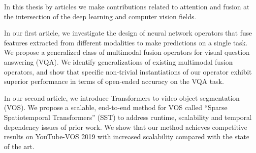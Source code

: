 In this thesis by articles we make contributions related to attention and
fusion at the intersection of the deep learning and computer vision fields.

In our first article, we investigate the design of neural network operators
that fuse features extracted from different modalities to make predictions on a
single task.
We propose a generalized class of multimodal fusion operators for visual
question answering (VQA).
We identify generalizations of existing multimodal fusion operators, and show
that specific non-trivial instantiations of our operator exhibit superior
performance in terms of open-ended accuracy on the VQA task.

In our second article, we introduce Transformers to video object segmentation
(VOS).
We propose a scalable, end-to-end method for VOS called
``Sparse Spatiotemporal Transformers'' (SST) to address runtime, scalability
and temporal dependency issues of prior work.
We show that our method achieves competitive results on YouTube-VOS 2019 with
increased scalability compared with the state of the art.
